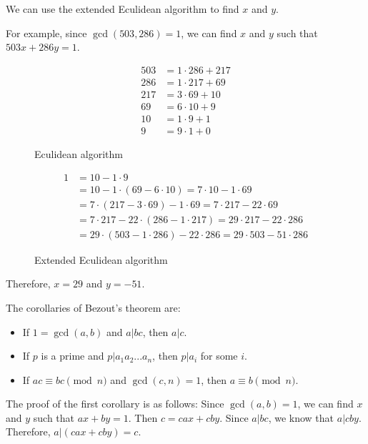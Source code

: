 \documentclass[a4paper,12pt]{article}
\begin{document}
We can use the extended Eculidean algorithm to find $x$ and $y$.

For example, since $\gcd(503,286) = 1$, we can find $x$ and $y$ such that $503x + 286y = 1$.
\begin{figure}[H]
	\begin{minipage}{0.5\textwidth}
		\begin{align*}
			503 &= 1 \cdot 286 + 217 \\
			286 &= 1 \cdot 217 + 69 \\
			217 &= 3 \cdot 69 + 10 \\
			69 &= 6 \cdot 10 + 9 \\
			10 &= 1 \cdot 9 + 1 \\
			9 &= 9 \cdot 1 + 0
		\end{align*}
		\caption*{Eculidean algorithm}
	\end{minipage}
	\begin{minipage}{0.5\textwidth}
		\begin{align*}
			1 &= 10 - 1 \cdot 9 \\
			&= 10 - 1 \cdot (69 - 6 \cdot 10) = 7 \cdot 10 - 1 \cdot 69 \\
			&= 7 \cdot (217 - 3 \cdot 69) - 1 \cdot 69 = 7 \cdot 217 - 22 \cdot 69 \\
			&= 7 \cdot 217 - 22 \cdot (286 - 1 \cdot 217) = 29 \cdot 217 - 22 \cdot 286 \\
			&= 29 \cdot (503 - 1 \cdot 286) - 22 \cdot 286 = 29 \cdot 503 - 51 \cdot 286
		\end{align*}
		\caption*{Extended Eculidean algorithm}
	\end{minipage}
\end{figure}

Therefore, $x = 29$ and $y = -51$.

The corollaries of Bezout's theorem are:
\begin{itemize}
	\item If $1 = \gcd(a,b)$ and $a|bc$, then $a|c$.
	\item If $p$ is a prime and $p|a_1 a_2 ... a_n$, then $p|a_i$ for some $i$.
	\item If $ac \equiv bc \pmod{n}$ and $\gcd(c,n) = 1$, then $a \equiv b \pmod{n}$.
\end{itemize}

The proof of the first corollary is as follows:
Since $\gcd(a,b) = 1$, we can find $x$ and $y$ such that $ax + by = 1$.
Then $c = cax + cby$.
Since $a|bc$, we know that $a|cby$.
Therefore, $a|(cax + cby) = c$.
\end{document}
